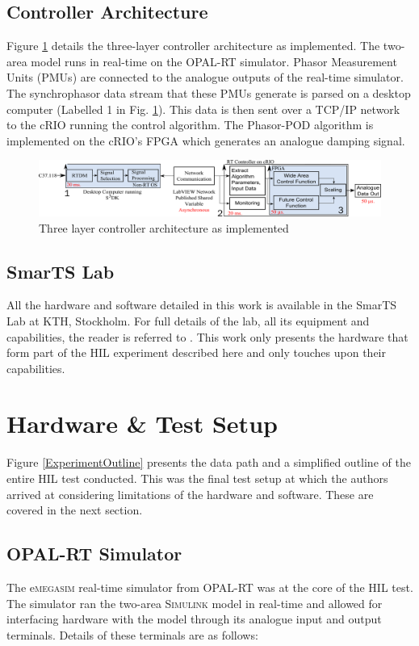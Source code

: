 \documentclass[conference]{IEEEtran}
\begin{document}
\subsection{Controller Architecture}
Figure \ref{FinalArch} details the three-layer controller architecture as implemented. The two-area model runs in real-time on the OPAL-RT simulator. Phasor Measurement Units (PMUs) are connected to the analogue outputs of the real-time simulator. The synchrophasor data stream that these PMUs generate is parsed on a desktop computer (Labelled 1 in Fig. \ref{FinalArch}). This data is then sent over a TCP/IP network to the cRIO running the control algorithm. The Phasor-POD algorithm is implemented on the cRIO's FPGA which generates an analogue damping signal.

\begin{figure}[th]
\centering
\includegraphics[width=5in]{ArchitectureDevelopment.pdf} 
\caption{Three layer controller architecture as implemented}
\label{FinalArch}
\end{figure}

\subsection{SmarTS Lab}
All the hardware and software detailed in this work is available in the SmarTS Lab at KTH, Stockholm. For full details of the lab, all its equipment and capabilities, the reader is referred to \cite{SmarTSLab}. This work only presents the hardware that form part of the HIL experiment described here and only touches upon their capabilities.

\section{Hardware \& Test Setup}\label{hardware}

Figure \ref{ExperimentOutline} presents the data path and a simplified outline of the entire HIL test conducted. This was the final test setup at which the authors arrived at considering limitations of the hardware and software. These are covered in the next section.

\subsection{OPAL-RT Simulator}
The e\textsc{megasim}\cite{eMEGASIM} real-time simulator from OPAL-RT\cite{OPALemegasim} was at the core of the HIL test. The simulator ran the two-area \textsc{Simulink} model in real-time and allowed for interfacing hardware with the model through its analogue input and output terminals.  Details of these terminals are as follows:
\end{document}
